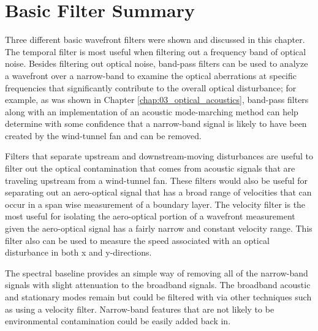 \section{Basic Filter Summary}
Three different basic wavefront filters were shown and discussed in this chapter.
The temporal filter is most useful when filtering out a frequency band of optical noise.
Besides filtering out optical noise, band-pass filters can be used to analyze a wavefront over a narrow-band to examine the optical aberrations at specific frequencies that significantly contribute to the overall optical disturbance; for example, as was shown in Chapter \ref{chap:03_optical_acoustics}, band-pass filters along with an implementation of an acoustic mode-marching method can help determine with some confidence that a narrow-band signal is likely to have been created by the wind-tunnel fan and can be removed.

Filters that separate upstream and downstream-moving disturbances are useful to filter out the optical contamination that comes from acoustic signals that are traveling upstream from a wind-tunnel fan.
These filters would also be useful for separating out an aero-optical signal that has a broad range of velocities that can occur in a span wise measurement of a boundary layer.
The velocity filter is the most useful for isolating the aero-optical portion of a wavefront measurement given the aero-optical signal has a fairly narrow and constant velocity range.
This filter also can be used to measure the speed associated with an optical disturbance in both x and y-directions.

The spectral baseline provides an simple way of removing all of the narrow-band signals with slight attenuation to the broadband signals.
The broadband acoustic and stationary modes remain but could be filtered with via other techniques such as using a velocity filter.
Narrow-band features that are not likely to be environmental contamination could be easily added back in.
